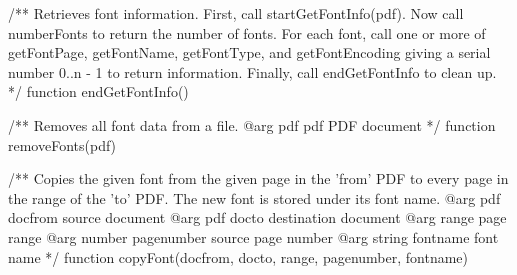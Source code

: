 /** Retrieves font information. First, call startGetFontInfo(pdf). Now call
numberFonts to return the number of fonts. For each font, call one or more of
getFontPage, getFontName, getFontType, and getFontEncoding giving a serial
number 0..n - 1 to return information. Finally, call endGetFontInfo to clean
up. */
function endGetFontInfo() {}

/** Removes all font data from a file.
@arg {pdf} pdf PDF document */
function removeFonts(pdf) {}

/** Copies the given font from the given page in the 'from' PDF to every page
in the range of the 'to' PDF. The new font is stored under its font name.
@arg {pdf} docfrom source document
@arg {pdf} docto destination document
@arg {range} page range
@arg {number} pagenumber source page number
@arg {string} fontname font name */
function copyFont(docfrom, docto, range, pagenumber, fontname) {}

